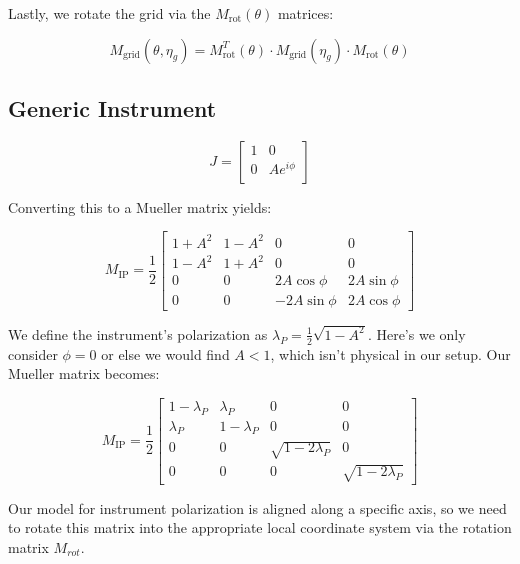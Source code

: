 Lastly, we rotate the grid via the $M_{\text{rot}}(\theta)$ matrices:

\begin{equation}
    M_{\text{grid}}(\theta,\eta_{g}) = M_{\text{rot}}^T(\theta) \cdot M_{\text{grid}}(\eta_{g})\cdot M_{\text{rot}}(\theta)
\end{equation}


\subsection{Generic Instrument}
\begin{equation}
    J = \begin{bmatrix}
    1 & 0 \\
    0 & A e^{i\phi}\\
  \end{bmatrix}
\end{equation}

Converting this to a Mueller matrix yields:

\begin{equation}
    M_{\text{IP}} = \frac{1}{2}\begin{bmatrix}
    1+A^2 & 1-A^2 & 0& 0\\
    1-A^2 & 1+A^2 & 0& 0\\
    0 & 0 & 2A\cos\phi & 2A\sin\phi\\
    0 & 0 & -2A\sin\phi & 2A\cos\phi
  \end{bmatrix}
\end{equation}

We define the instrument's polarization as $\lambda_P = \frac{1}{2}\sqrt{1-A^2}$.  Here's we only consider $\phi=0$ or else we would find $A<1$, which isn't physical in our setup.  Our Mueller matrix becomes:

\begin{equation}
    M_{\text{IP}} = \frac{1}{2}\begin{bmatrix}
    1-\lambda_P & \lambda_P & 0& 0\\
    \lambda_P & 1-\lambda_P & 0& 0\\
    0 & 0 & \sqrt{1-2\lambda_P} & 0\\
    0 & 0 & 0 & \sqrt{1-2\lambda_P}
  \end{bmatrix}
\end{equation}

Our model for instrument polarization is aligned along a specific axis, so we need to rotate this matrix into the appropriate local coordinate system via the rotation matrix $M_{rot}$.

